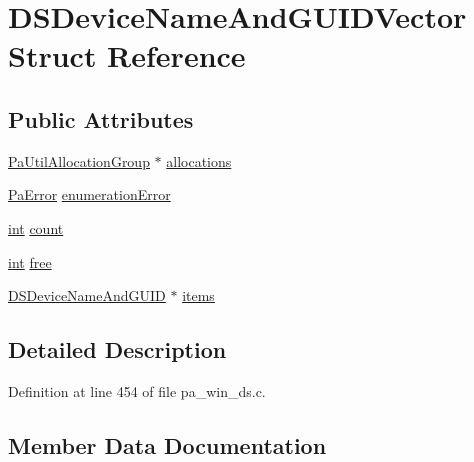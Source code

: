 \hypertarget{struct_d_s_device_name_and_g_u_i_d_vector}{}\section{D\+S\+Device\+Name\+And\+G\+U\+I\+D\+Vector Struct Reference}
\label{struct_d_s_device_name_and_g_u_i_d_vector}
\subsection*{Public Attributes}
\begin{DoxyCompactItemize}
\item 
\hyperlink{struct_pa_util_allocation_group}{Pa\+Util\+Allocation\+Group} $\ast$ \hyperlink{struct_d_s_device_name_and_g_u_i_d_vector_ab52cdf0ee0b95dd0899d603174fc45f7}{allocations}
\item 
\hyperlink{portaudio_8h_a4949e4a8ef9f9dbe8cbee414ce69841d}{Pa\+Error} \hyperlink{struct_d_s_device_name_and_g_u_i_d_vector_a4ffdf8a98ae5b9508ea666e48bf0f10a}{enumeration\+Error}
\item 
\hyperlink{xmltok_8h_a5a0d4a5641ce434f1d23533f2b2e6653}{int} \hyperlink{struct_d_s_device_name_and_g_u_i_d_vector_a80d6776eaa6446da8b8dbe28a5d46eab}{count}
\item 
\hyperlink{xmltok_8h_a5a0d4a5641ce434f1d23533f2b2e6653}{int} \hyperlink{struct_d_s_device_name_and_g_u_i_d_vector_a8a1a70007667048fcfbd3cf6415aa3ad}{free}
\item 
\hyperlink{struct_d_s_device_name_and_g_u_i_d}{D\+S\+Device\+Name\+And\+G\+U\+ID} $\ast$ \hyperlink{struct_d_s_device_name_and_g_u_i_d_vector_ae2afb469c948edb3314d3f1cc204a8bc}{items}
\end{DoxyCompactItemize}


\subsection{Detailed Description}


Definition at line 454 of file pa\+\_\+win\+\_\+ds.\+c.



\subsection{Member Data Documentation}
